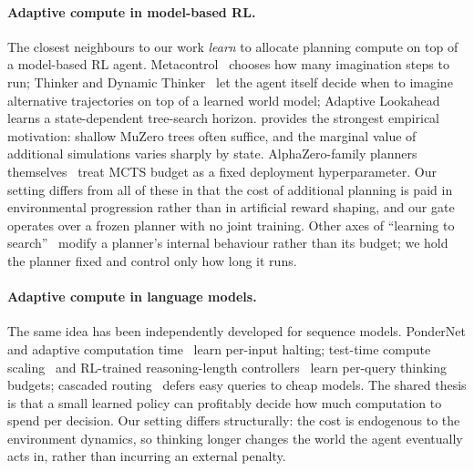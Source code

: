 \paragraph{Adaptive compute in model-based RL.}
The closest neighbours to our work \emph{learn} to allocate planning
compute on top of a model-based RL agent.
Metacontrol~\citep{hamrick2017metacontrol} chooses how many imagination
steps to run; Thinker and Dynamic Thinker~\citep{chung2023thinker,
wang2024dynamic} let the agent itself decide when to imagine alternative
trajectories on top of a learned world model; Adaptive
Lookahead~\citep{dalal2022adaptive} learns a state-dependent tree-search
horizon.
\citet{hamrick2021role} provides the strongest empirical motivation:
shallow MuZero trees often suffice, and the marginal value of additional
simulations varies sharply by state.
AlphaZero-family planners themselves~\citep{silver2018general,
schrittwieser2020muzero,danihelka2022policy} treat MCTS budget as a
fixed deployment hyperparameter.
Our setting differs from all of these in that the cost of additional
planning is paid in environmental progression rather than in artificial
reward shaping, and our gate operates over a frozen planner with no
joint training.
Other axes of ``learning to search''~\citep{guez2018mctsnets,
farquhar2018treeqn,hamrick2020save,racaniere2017i2a} modify a planner's
internal behaviour rather than its budget; we hold the planner fixed and
control only how long it runs.

\paragraph{Adaptive compute in language models.}
The same idea has been independently developed for sequence models.
PonderNet and adaptive computation time~\citep{graves2016act,
banino2021pondernet,schuster2022calm} learn per-input halting; test-time
compute scaling~\citep{snell2024scaling,deepseek2025r1,muennighoff2025s1}
and RL-trained reasoning-length controllers~\citep{aggarwal2025l1,
muppidi2025predictive,fang2025thinkless,shen2025dast} learn per-query
thinking budgets; cascaded routing~\citep{kim2023bigl,chen2023frugalgpt,
ong2025routellm} defers easy queries to cheap models.
The shared thesis is that a small learned policy can profitably decide
how much computation to spend per decision.
Our setting differs structurally: the cost is endogenous to the
environment dynamics, so thinking longer changes the world the agent
eventually acts in, rather than incurring an external penalty.


